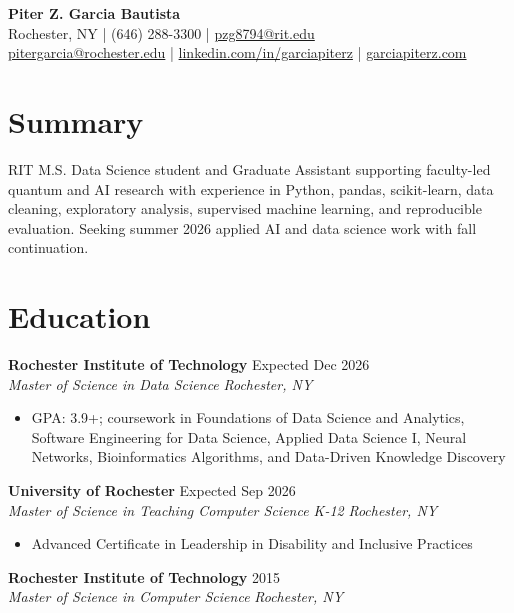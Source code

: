 \documentclass[10pt,letterpaper]{article}
\newcommand{\entry}[4]{
  \textbf{#1} \hfill #2 \\
  \textit{#3} \hfill \textit{#4}
}
\begin{document}
\small

\begin{center}
{\LARGE \textbf{Piter Z. Garcia Bautista}}\\[4pt]
Rochester, NY \quad | \quad (646) 288-3300 \quad | \quad \href{mailto:pzg8794@rit.edu}{pzg8794@rit.edu}\\
\href{mailto:pitergarcia@rochester.edu}{pitergarcia@rochester.edu} \quad | \quad \href{https://linkedin.com/in/garciapiterz}{linkedin.com/in/garciapiterz} \quad | \quad \href{https://garciapiterz.com}{garciapiterz.com}
\end{center}

\section{Summary}
RIT M.S. Data Science student and Graduate Assistant supporting faculty-led quantum and AI research with experience in Python, pandas, scikit-learn, data cleaning, exploratory analysis, supervised machine learning, and reproducible evaluation. Seeking summer 2026 applied AI and data science work with fall continuation.

\section{Education}
\entry{Rochester Institute of Technology}{Expected Dec 2026}{Master of Science in Data Science}{Rochester, NY}
\begin{itemize}
    \item GPA: 3.9+; coursework in Foundations of Data Science and Analytics, Software Engineering for Data Science, Applied Data Science I, Neural Networks, Bioinformatics Algorithms, and Data-Driven Knowledge Discovery
\end{itemize}

\entry{University of Rochester}{Expected Sep 2026}{Master of Science in Teaching Computer Science K-12}{Rochester, NY}
\begin{itemize}
    \item Advanced Certificate in Leadership in Disability and Inclusive Practices
\end{itemize}

\entry{Rochester Institute of Technology}{2015}{Master of Science in Computer Science}{Rochester, NY}
\end{document}
